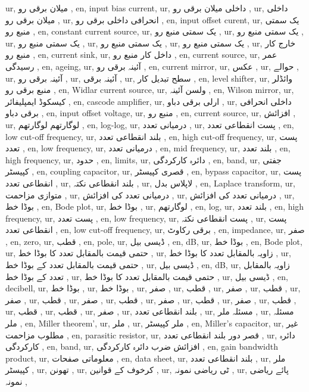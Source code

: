 ur, میلان برقی رو ,
en, input bias current,
ur, داخلی میلان برقی رو ,
ur, داخلی میلان برقی رو ,
ur, انحرافی داخلی برقی رو ,
en, input offset curent,
ur, یک سمتی منبع رو ,
en, constant current source,
ur, یک سمتی منبع رو ,
ur, یک سمتی منبع رو ,
ur, یک سمتی منبع رو ,
ur, یک سمتی منبع رو ,
ur, یک سمتی منبع رو ,
ur, خارج کار منبع رو ,
en, current sink,
ur, داخل کار منبع رو ,
en, current source,
ur, عمر رسیدگی ,
en, ageing,
ur, آئینہ برقی رو ,
en, current mirror,
ur, عکس ,
ur, حوالے ,
ur, آئینہ برقی رو ,
ur, آئینہ برقی ,
ur, سطح تبدیل کار ,
en, level shifter,
ur, وائڈلر منبع برقی رو ,
en, Widlar current source,
ur, ولسن آئینہ ,
en, Wilson mirror,
ur, کیسکوڈ ایمپلیفائر ,
en, cascode amplifier,
ur, ارلی برقی دباو ,
ur, داخلی انحرافی برقی دباو ,
en, input offset voltage,
ur, منبع رو ,
en, current source,
ur, افزائش ,
ur, لوگارتھم لوگارتھم ,
en, log-log,
ur, درمیانی تعدد ,
ur, پست انقطاعی تعدد ,
en, low cut-off frequency,
ur, بلند انقطاعی تعدد ,
en, high cut-off frequency,
ur, پست تعدد ,
en, low frequency,
ur, درمیانی تعدد ,
en, mid frequency,
ur, بلند تعدد ,
en, high frequency,
ur, حدود ,
en, limits,
ur, دائرہ کارکردگی ,
en, band,
ur, جفتی کپیسٹر ,
en, coupling capacitor,
ur, قصری کپیسٹر ,
en, bypass capacitor,
ur, پست انقطاعی تعدد ,
ur, بلند انقطاعی نکتہ ,
ur, لاپلاس بدل ,
en, Laplace transform,
ur, متوازی مزاحمت ,
ur, درمیانی تعدد کی افزائش ,
ur, درمیانی تعدد کی افزائش ,
ur, بوڈا خط ,
en, Bode plot,
ur, بوڈا خط ,
ur, لوگارتھم ,
en, log,
ur, بلند تعدد ,
en, high frequency,
ur, پست تعدد ,
en, low frequency,
ur, پست انقطاعی نکتہ ,
ur, پست انقطاعی تعدد ,
en, low cut-off frequency,
ur, برقی رکاوٹ ,
en, impedance,
ur, صفر ,
en, zero,
ur, قطب ,
en, pole,
ur, ڈیسی بیل ,
en, \si {dB},
ur, بوڈا خط ,
en, Bode plot,
ur, حتمی قیمت بالمقابل تعدد کا بوڈا خط ,
ur, زاویہ بالمقابل تعدد کا بوڈا خط ,
ur, حتمی قیمت بالمقابل تعدد کے بوڈا خط ,
ur, ڈیسی بیل ,
en, dB,
ur, زاویہ بالمقابل تعدد کے بوڈا خط ,
ur, حتمی قیمت بالمقابل تعدد کا بوڈا خط ,
ur, ڈیسی بیل ,
en, decibell,
ur, بوڈا خط ,
ur, بوڈا خط ,
ur, صفر ,
ur, قطب ,
ur, صفر ,
ur, قطب ,
ur, صفر ,
ur, قطب ,
ur, صفر ,
ur, قطب ,
ur, صفر ,
ur, قطب ,
ur, صفر ,
ur, قطب ,
ur, قطب ,
ur, قطب ,
ur, صفر ,
ur, بلند انقطاعی تعدد ,
ur, مسئلہ ملر ,
ur, مسئلہ ملر ,
en, Miller theorem',
ur, ملر ,
ur, ملر کپیسٹر ,
en, Miller's capacitor,
ur, غیر مطلوب مزاحمت ,
en, parasitic resistor,
ur, قصر دور بلند انقطاعی تعدد ,
ur, دائرہ کارکردگی ,
en, band,
ur, افزائش ضرب دائرہ کارکردگی ,
en, gain bandwidth product,
ur, معلوماتی صفحات ,
en, data sheet,
ur, بلند انقطاعی تعدد ,
ur, ملر کپیسٹر ,
ur, تھونن ,
ur, کرخوف کے قوانین ,
ur, ٹی ریاضی نمونہ ,
ur, پائے ریاضی نمونہ ,
